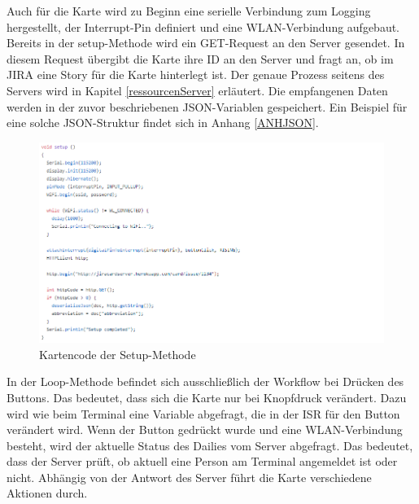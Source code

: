 \documentclass[12pt,titlepage]{scrartcl}
\begin{document}
		\noindent Auch für die Karte wird zu Beginn eine serielle Verbindung zum Logging hergestellt, der Interrupt-Pin definiert und eine WLAN-Verbindung aufgebaut. Bereits in der setup-Methode wird ein GET-Request an den Server gesendet. In diesem Request übergibt die Karte ihre ID an den Server und fragt an, ob im JIRA eine Story für die Karte hinterlegt ist. Der genaue Prozess seitens des Servers wird in Kapitel \ref{ressourcenServer} erläutert. Die empfangenen Daten werden in der zuvor beschriebenen JSON-Variablen gespeichert. Ein Beispiel für eine solche JSON-Struktur findet sich in Anhang \ref{ANHJSON}. \\
		\begin{figure}[H] 
  			\centering
    		\includegraphics[height=0.5\textheight]{storySetup}
  			\caption{Kartencode der Setup-Methode}
  			\label{fig:storySetup}
		\end{figure}
		\noindent In der Loop-Methode befindet sich ausschließlich der Workflow bei Drücken des Buttons. Das bedeutet, dass sich die Karte nur bei Knopfdruck verändert. Dazu wird wie beim Terminal eine Variable abgefragt, die in der ISR für den Button verändert wird. Wenn der Button gedrückt wurde und eine WLAN-Verbindung besteht, wird der aktuelle Status des Dailies vom Server abgefragt. Das bedeutet, dass der Server prüft, ob aktuell eine Person am Terminal angemeldet ist oder nicht. Abhängig von der Antwort des Server führt die Karte verschiedene Aktionen durch. \\
\end{document}
